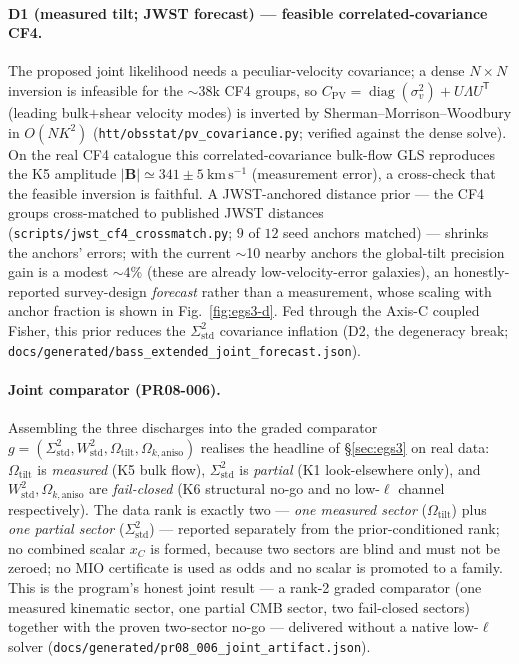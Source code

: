 \documentclass[11pt,a4paper]{article}
\newcommand{\xC}{x_{C}}
\newcommand{\Sigstd}{\Sigma^{2}_{\mathrm{std}}}
\newcommand{\Wstd}{W^{2}_{\mathrm{std}}}
\newcommand{\Otilt}{\Omega_{\mathrm{tilt}}}
\newcommand{\Okaniso}{\Omega_{k,\mathrm{aniso}}}
\theoremstyle{plain}
\theoremstyle{definition}
\begin{document}
\paragraph{D1 (measured tilt; JWST forecast) --- feasible correlated-covariance CF4.}
The proposed joint likelihood needs a peculiar-velocity covariance; a dense
$N\times N$ inversion is infeasible for the $\sim$38k CF4 groups, so
$C_{\mathrm{PV}}=\operatorname{diag}(\sigma_v^2)+U\Lambda U^{\mathsf T}$ (leading
bulk$+$shear velocity modes) is inverted by Sherman--Morrison--Woodbury in
$O(NK^2)$ (\texttt{htt/obsstat/pv\_covariance.py}; verified against the dense
solve). On the real CF4 catalogue this correlated-covariance bulk-flow GLS
reproduces the K5 amplitude $|\mathbf B|\simeq341\pm5\ \mathrm{km\,s^{-1}}$
(measurement error), a cross-check that the feasible inversion is faithful. A
JWST-anchored distance prior --- the CF4 groups cross-matched to published JWST
distances (\texttt{scripts/jwst\_cf4\_crossmatch.py}; $9$ of $12$ seed anchors
matched) --- shrinks the anchors' errors; with the current $\sim$10 nearby anchors
the global-tilt precision gain is a modest $\sim$$4\%$ (these are already
low-velocity-error galaxies), an honestly-reported survey-design \emph{forecast}
rather than a measurement, whose scaling with anchor fraction is shown in
Fig.~\ref{fig:egs3-d}. Fed through the Axis-C coupled Fisher, this prior reduces
the $\Sigstd$ covariance inflation (D2, the degeneracy break;
\texttt{docs/generated/bass\_extended\_joint\_forecast.json}).

\paragraph{Joint comparator (PR08-006).} Assembling the three discharges into the
graded comparator $g=(\Sigstd,\Wstd,\Otilt,\Okaniso)$ realises the headline of
\S\ref{sec:egs3} on real data: $\Otilt$ is \emph{measured} (K5 bulk flow), $\Sigstd$
is \emph{partial} (K1 look-elsewhere only), and $\Wstd,\Okaniso$ are \emph{fail-closed}
(K6 structural no-go and no low-$\ell$ channel respectively). The data rank is exactly
two --- \emph{one measured sector} ($\Otilt$) plus \emph{one partial sector}
($\Sigstd$) --- reported separately from the prior-conditioned rank; no combined
scalar $\xC$ is formed, because two sectors are blind and must not be zeroed; no
MIO certificate is used as odds and no scalar is promoted to a family. This is the
program's honest joint result --- a rank-2 graded comparator (one measured
kinematic sector, one partial CMB sector, two fail-closed sectors) together with
the proven two-sector no-go --- delivered without a native low-$\ell$ solver
(\texttt{docs/generated/pr08\_006\_joint\_artifact.json}).
\end{document}
